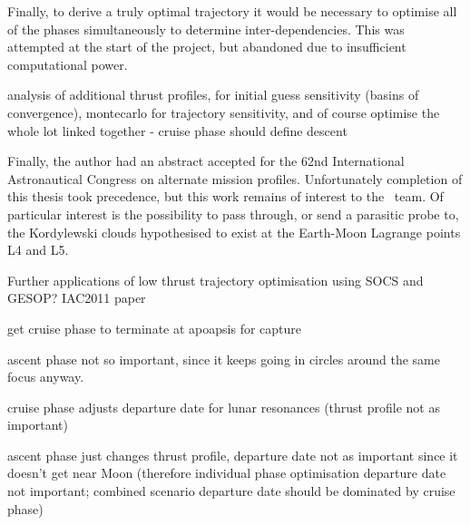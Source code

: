 Finally, to derive a truly optimal trajectory it would be necessary to optimise all of the phases simultaneously to determine inter-dependencies. This was attempted at the start of the project, but abandoned due to insufficient computational power. 



analysis of additional thrust profiles, for initial guess sensitivity (basins of convergence), montecarlo for trajectory sensitivity, and of course optimise the whole lot linked together - cruise phase should define descent

Finally, the author had an abstract accepted for the 62nd International Astronautical Congress on alternate mission profiles. Unfortunately completion of this thesis took precedence, but this work remains of interest to the \BW\ team. Of particular interest is the possibility to pass through, or send a parasitic probe to, the Kordylewski clouds hypothesised to exist at the Earth-Moon Lagrange points L4 and L5.

Further applications of low thrust trajectory optimisation using SOCS and GESOP? IAC2011 paper



get cruise phase to terminate at apoapsis for capture

ascent phase not so important, since it keeps going in circles around the same focus anyway.

cruise phase adjusts departure date for lunar resonances (thrust profile not as important)

ascent phase just changes thrust profile, departure date not as important since it doesn't get near Moon (therefore individual phase optimisation departure date not important; combined scenario departure date should be dominated by cruise phase)

